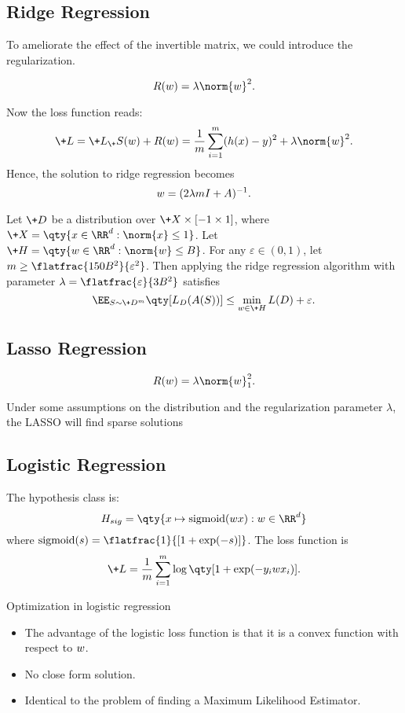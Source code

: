 \subsection{Ridge Regression}

To ameliorate the effect of the invertible matrix, we could introduce the regularization.

\begin{defi}
	\[
		R(w)=
		\lambda\norm{w}^2
	.\]
\end{defi}

Now the loss function reads:
\[
	\+L=\+L_\+S(w)+R(w)=
	\frac{1}{m}\sum_{i=1}^m(h(\*x)-\*y)^2+\lambda\norm{w}^2
.\] 
Hence, the solution to ridge regression becomes
\[
	\*w=(2\lambda mI+ A)^{-1}
.\] 
\begin{thm}
	Let $\+D$ be a distribution over  $\+X\times[-1\times 1]$, where  $\+X=\qty{\*x\in\RR^d:\norm{\*x}\le 1}$. Let $\+H=\qty{\*w\in\RR^d:\norm{\*w}\le B}$. For any $\varepsilon\in(0,1)$, let $m\ge \flatfrac{150B^2}{\varepsilon^2}$. Then applying the ridge regression algorithm with parameter $\lambda=\flatfrac{\varepsilon}{3B^2}$ satisfies
	\[
		\EE_{S\sim\+D^m}\qty[L_D(A(S))]\le \min_{\*w\in\+H}L(D)+\varepsilon
	.\] 
\end{thm}

\subsection{Lasso Regression}
\begin{defi}
	\[
		R(w)=
		\lambda\norm{w}_1^2
	.\]
\end{defi}
Under some assumptions on the distribution and the regularization parameter $\lambda$, the LASSO will find sparse solutions

\subsection{Logistic Regression}
The hypothesis class is:
\[
	H_{sig}=\qty{x\mapsto \mathrm{sigmoid}(\*w\*x):\*w\in\RR^d}
\] where $\mathrm{sigmoid}(s)=\flatfrac{1}{[1+\exp(-s)]}$.
The loss function is
\[
	\+L=\frac{1}{m}\sum_{i=1}^m\log\qty[1+\exp(-y_i\*w\*x_i)]
.\]
\begin{remark}Optimization in logistic regression
	\begin{itemize}
		\item 
			The advantage of the logistic loss function is that it is a convex function with respect to $\*w$.
		\item
			No close form solution.
		\item 
			Identical to the problem of finding a Maximum Likelihood Estimator.
	\end{itemize}
\end{remark}

